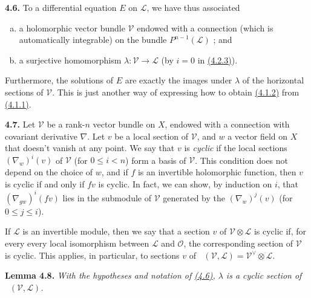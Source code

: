 \documentclass{report}
\newenvironment{itenv}[1]
  {\phantomsection\par\medskip\noindent\textbf{#1.}\itshape}
  {\par\medskip}
\newenvironment{rmenv}[1]
  {\phantomsection\par\medskip\noindent\textbf{#1.}\rmfamily}
  {\par\medskip}
\newcommand{\scr}[1]{{\mathscr{#1}}}
\renewcommand{\cal}[1]{{\mathcal{#1}}}
\renewcommand{\leq}{\leqslant}
\DeclareMathOperator{\shHom}{\underline{Hom}}
\newcommand{\oldpage}[1]{\marginpar{\footnotesize$\Big\vert$ \textit{p.~#1}}}
\begin{document}
\begin{rmenv}{4.6}
\label{I.4.6}
  To a differential equation $E$ on $\scr{L}$, we have thus associated
  \begin{enumerate}[a)]
    \item a holomorphic vector bundle $\cal{V}$ endowed with a connection (which is automatically integrable) on the bundle $P^{n-1}(\scr{L})$ ; and
    \item a surjective homomorphism $\lambda\colon\cal{V}\to\scr{L}$ (by $i=0$ in \hyperref[I.4.2.3]{(4.2.3)}).
  \end{enumerate}
  Furthermore, the solutions of $E$ are exactly the images under $\lambda$ of the horizontal sections of $\cal{V}$.
  This is just another way of expressing how to obtain \hyperref[I.4.1.2]{(4.1.2)} from \hyperref[I.4.1.1]{(4.1.1)}.
\end{rmenv}

\oldpage{26}
\begin{rmenv}{4.7}
\label{I.4.7}
  Let $\cal{V}$ be a rank-$n$ vector bundle on $X$, endowed with a connection with covariant derivative $\nabla$.
  Let $v$ be a local section of $\cal{V}$, and $w$ a vector field on $X$ that doesn't vanish at any point.
  We say that $v$ is \emph{cyclic} if the local sections $(\nabla_w)^i(v)$ of $\cal{V}$ (for $0\leq i<n$) form a basis of $\cal{V}$.
  This condition does not depend on the choice of $w$, and if $f$ is an invertible holomorphic function, then $v$ is cyclic if and only if $fv$ is cyclic.
  In fact, we can show, by induction on $i$, that $(\nabla_{gw})^i(fv)$ lies in the submodule of $\cal{V}$ generated by the $(\nabla_w)^j(v)$ (for $0\leq j\leq i$).

  If $\scr{L}$ is an invertible module, then we say that a section $v$ of $\cal{V}\otimes\scr{L}$ is cyclic if, for every every local isomorphism between $\scr{L}$ and $\cal{O}$, the corresponding section of $\cal{V}$ is cyclic.
  This applies, in particular, to sections $v$ of $\shHom(\cal{V},\scr{L})=\cal{V}^\vee\otimes\scr{L}$.
\end{rmenv}

\begin{itenv}{Lemma 4.8}
\label{I.4.8}
  With the hypotheses and notation of \hyperref[I.4.6]{(4.6)}, $\lambda$ is a cyclic section of $\shHom(\cal{V},\scr{L})$.
\end{itenv}
\end{document}
